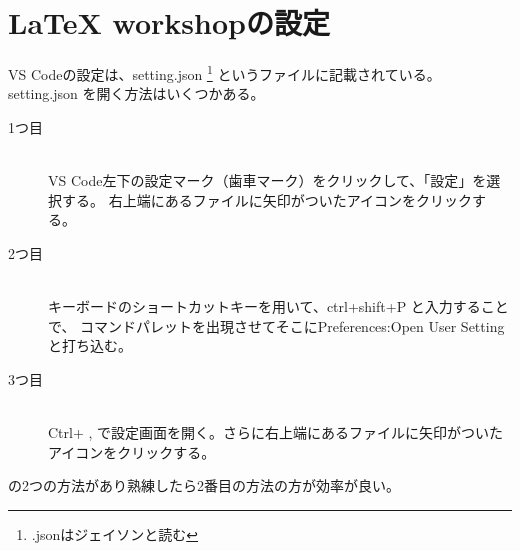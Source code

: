\documentclass[titlepage]{ltjsarticle}
\begin{document}
\section{LaTeX workshopの設定}
VS Codeの設定は、setting.json
\footnote{.jsonはジェイソンと読む}
というファイルに記載されている。
setting.json を開く方法はいくつかある。
\begin{description}
  \item[1つ目] ~\\
    VS Code左下の設定マーク（歯車マーク）をクリックして、「設定」を選択する。
    右上端にあるファイルに矢印がついたアイコンをクリックする。
  \item[2つ目] ~\\
    キーボードのショートカットキーを用いて、ctrl+shift+P と入力することで、
    コマンドパレットを出現させてそこにPreferences:Open User Setting
    と打ち込む。
    \item[3つ目]~\\
    Ctrl+ , で設定画面を開く。さらに右上端にあるファイルに矢印がついたアイコンをクリックする。
\end{description}
の2つの方法があり熟練したら2番目の方法の方が効率が良い。
\end{document}
